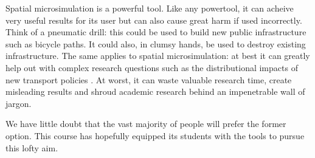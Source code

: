 \documentclass[a4paper, 11pt, twoside]{article}
\begin{document}
Spatial microsimulation is a powerful tool.
Like any powertool, it can acheive very useful results for its user
but can also cause great harm if used incorrectly. 
Think of a pneumatic drill: this could be used to build new
public infrastructure such as bicycle paths. It could also,
in clumsy hands, be used to destroy existing infrastructure.
The same applies to spatial microsimulation:
at best it can greatly help out with complex research questions such
as the distributional impacts of new transport policies \citep{Lovelace2014-jtg}.
At worst, it can waste valuable research time, create misleading results
and shroud academic research behind an impenetrable wall of jargon.

We have little doubt that the vast majority of
people will prefer the former option. This course has hopefully
equipped its students with
the tools to pursue this lofty aim.
\end{document}
